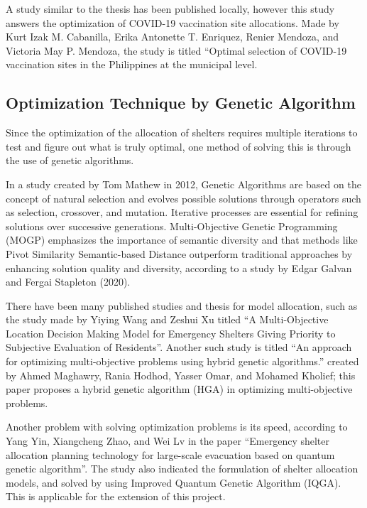 A study similar to the thesis has been published locally, however this study answers the optimization of COVID-19 vaccination site allocations. Made by Kurt Izak M. Cabanilla, Erika Antonette T. Enriquez, Renier Mendoza, and Victoria May P. Mendoza, the study is titled “Optimal selection of COVID-19 vaccination sites in the Philippines at the municipal level. \parencite{Kurt2021}

\subsection{Optimization Technique by Genetic Algorithm}

Since the optimization of the allocation of shelters requires multiple iterations to test and figure out what is truly optimal, one method of solving this is through the use of genetic algorithms.

In a study created by Tom Mathew in 2012, Genetic Algorithms are based on the concept of natural selection and evolves possible solutions through operators such as selection, crossover, and mutation. Iterative processes are essential for refining solutions over successive generations. Multi-Objective Genetic Programming (MOGP) emphasizes the importance of semantic diversity and that methods like Pivot Similarity Semantic-based Distance outperform traditional approaches by enhancing solution quality and diversity, according to a study by Edgar Galvan and Fergai Stapleton (2020). \parencite{Mathew2012}

There have been many published studies and thesis for model allocation, such as the study made by Yiying Wang and Zeshui Xu titled “A Multi-Objective Location Decision Making Model for Emergency Shelters Giving Priority to Subjective Evaluation of Residents”. Another such study is titled “An approach for optimizing multi-objective problems using hybrid genetic algorithms.” created by Ahmed Maghawry, Rania Hodhod, Yasser Omar, and Mohamed Kholief; this paper proposes a hybrid genetic algorithm (HGA) in optimizing multi-objective problems. \parencite{Yiying2022}

Another problem with solving optimization problems is its speed, according to Yang Yin, Xiangcheng Zhao, and Wei Lv in the paper “Emergency shelter allocation planning technology for large-scale evacuation based on quantum genetic algorithm”. The study also indicated the formulation of shelter allocation models, and solved by using Improved Quantum Genetic Algorithm (IQGA). This is applicable for the extension of this project. \parencite{Yin2023}

